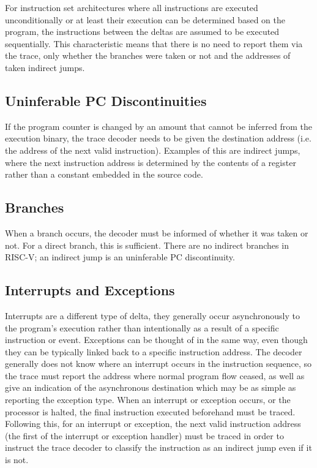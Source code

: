 For instruction set architectures where all instructions are executed
unconditionally or at least their execution can be determined based on
the program, the instructions between the deltas are assumed to be
executed sequentially. This characteristic means that there is no need
to report them via the trace, only whether the branches were taken or not
and the addresses of taken indirect jumps.

\subsection{Uninferable PC Discontinuities} \label{uninfpc}

If the program counter is changed by an amount that cannot be
inferred from the execution binary, the trace decoder needs to be
given the destination address (i.e. the address of the next valid
instruction).  Examples of this are indirect jumps, where
the next instruction address is determined by the contents of a
register rather than a constant embedded in the source code.

\subsection{Branches} \label{branches}

When a branch occurs, the decoder must be informed of whether it was
taken or not.  For a direct branch, this is sufficient.  There are no
indirect branches in RISC-V; an indirect jump is an uninferable PC
discontinuity.

\subsection{Interrupts and Exceptions} \label{interruptsexceptions}

Interrupts are a different type of delta, they generally occur
asynchronously to the program's execution rather than intentionally as
a result of a specific instruction or event. Exceptions can be thought
of in the same way, even though they can be typically linked back to a
specific instruction address.  The decoder generally does not know
where an interrupt occurs in the instruction sequence, so the trace
must report the address where normal program flow ceased, as well as
give an indication of the asynchronous destination which may be as
simple as reporting the exception type.  When an interrupt or
exception occurs, or the processor is halted, the final instruction
executed beforehand must be traced.  Following this, for an interrupt
or exception, the next valid instruction address (the first of the
interrupt or exception handler) must be traced in order to instruct the
trace decoder to classify the instruction as an indirect jump even
if it is not.


